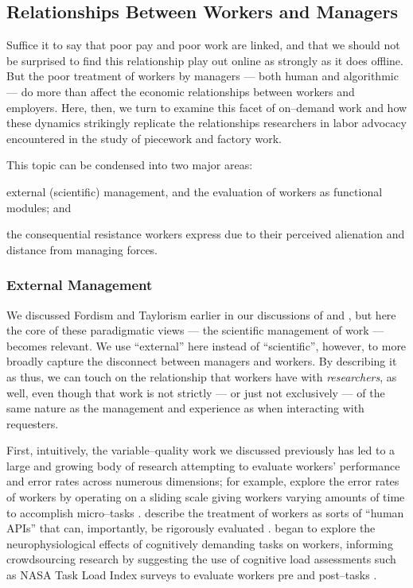 \documentclass{sigchi}
\begin{document}
\subsection{Relationships Between Workers and Managers}\label{sec:relationships}
Suffice it to say that poor pay and poor work are linked,
and that we should not be surprised to find this relationship play out online as strongly as it does offline.
But the poor treatment of workers by managers
--- both human and algorithmic ---
do more than affect the economic relationships between workers and employers.
Here, then, we turn to examine this facet of on--demand work
and how these dynamics strikingly replicate the relationships
researchers in labor advocacy encountered in the study of piecework and factory work.

This topic can be condensed into two major areas:
\begin{inlinelist}
\item external (scientific) management, and the evaluation of workers as functional modules; and
\item the consequential resistance workers express due to their perceived alienation and distance from managing forces.
\end{inlinelist}

\subsubsection{External Management}
We discussed Fordism and Taylorism earlier in our discussions of
 and ,
but here the core of these paradigmatic views
--- the scientific management of work ---
becomes relevant.
We use ``external'' here instead of ``scientific'', however,
to more broadly capture the disconnect between managers and workers.
By describing it as thus,
we can touch on the relationship that workers have with \textit{researchers}, as well,
even though that work is not strictly
--- or just not exclusively ---
of the same nature as the management and experience as when interacting with requesters.

First, intuitively, the variable--quality work we discussed previously has led to
a large and growing body of research attempting to evaluate workers' performance and error rates
across numerous dimensions;
for example, \citeauthor{measuringCrowdsourcingCheng} explore the error rates of workers by
operating on a sliding scale giving workers varying amounts of time to accomplish micro--tasks
\cite{measuringCrowdsourcingCheng}.
\citeauthor{storiesIraniSilberman} describe the treatment of workers
as sorts of ``human APIs'' that can, importantly, be rigorously evaluated
\cite{storiesIraniSilberman}.
\citeauthor{gevins2003neurophysiological} began to explore the neurophysiological effects of
cognitively demanding tasks on workers,
informing crowdsourcing research by suggesting the use of cognitive load assessments such as
NASA Task Load Index surveys to evaluate workers pre and post--tasks
\cite{embracingErrorKrishna,measuringCrowdsourcingCheng}.
\end{document}
